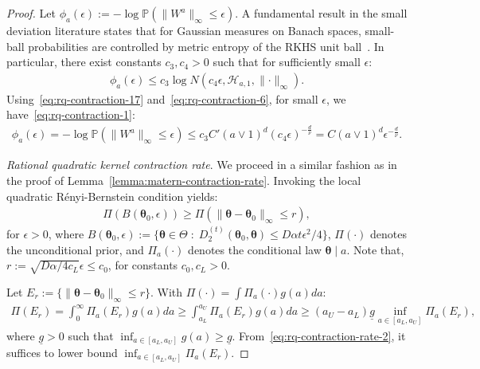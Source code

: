 \documentclass[final,12pt]{colt2026} %
\begin{document}
\begin{proof}
Let $\phi_a(\epsilon):= -\log \mathbb{P}(\lVert W^{a}\rVert_{\infty} \leq \epsilon)$. A fundamental result in the small deviation literature states that for Gaussian measures on Banach spaces, small-ball probabilities are controlled by metric entropy of the RKHS unit ball~\citep{vanZantenVanDerVaart2008IMS}. In particular, there exist constants $c_3, c_4 > 0$ such that for sufficiently small $\epsilon$:
\begin{align}
\label{eq:rq-contraction-17}
\phi_a(\epsilon) \leq c_3 \log N(c_4 \epsilon, \mathcal{H}_{a, 1}, \lVert \cdot \rVert_{\infty}).
\end{align}
Using~\eqref{eq:rq-contraction-17} and~\eqref{eq:rq-contraction-6}, for small $\epsilon$, we have~\eqref{eq:rq-contraction-1}:
\begin{align*}
\phi_a(\epsilon) = -\log \mathbb{P}(\lVert W^{a}\rVert_{\infty} \leq \epsilon) \leq c_3 C'(a\vee 1)^{d}(c_4\epsilon)^{-\frac{d}{\nu}} = C(a\vee 1)^{d}\epsilon^{-\frac{d}{\nu}}.
\end{align*}

\medskip
\noindent\textit{Rational quadratic kernel contraction rate}. We proceed in a similar fashion as in the proof of Lemma~\ref{lemma:matern-contraction-rate}. Invoking the local quadratic R\'{e}nyi-Bernstein condition yields:
\begin{align}
\label{eq:rq-contraction-rate-1}
\Pi\left(B(\pmb\theta_0, \epsilon)\right) \geq \Pi\left(\lVert \pmb\theta - \pmb\theta_0\rVert_{\infty} \leq r\right),
\end{align}
for $\epsilon >0$, where $B(\pmb\theta_0, \epsilon) := \{\pmb\theta \in \Theta\;:\; D_2^{(t)}(\pmb\theta_0, \pmb\theta) \leq D\alpha t\epsilon^2/4\}$, $\Pi(\cdot)$ denotes the unconditional prior, and $\Pi_a(\cdot)$ denotes the conditional law $\pmb\theta \mid a$. Note that, $r:= \sqrt{D\alpha /4c_L}\epsilon \leq c_0$, for constants $c_0, c_L>0$.

Let $E_r:= \{\lVert \pmb\theta - \pmb\theta_0\rVert_{\infty}\leq r\}$. With $\Pi(\cdot) = \int \Pi_a(\cdot)g(a) da$:
\begin{align}
\label{eq:rq-contraction-rate-2}
\Pi(E_r) = \int_{0}^{\infty}\Pi_a(E_r) g(a)da \geq \int_{a_L}^{a_U}\Pi_a(E_r)g(a)da \geq (a_U-a_L)\underline{g}\inf_{a\in [a_L, a_U]}\Pi_a(E_r),
\end{align}
where $\underline{g} > 0$ such that $\inf_{a\in [a_L, a_U]}g(a) \geq \underline{g}$. From~\eqref{eq:rq-contraction-rate-2}, it suffices to lower bound $\inf_{a\in [a_L, a_U]}\Pi_a(E_r)$.


\end{proof}
\end{document}
